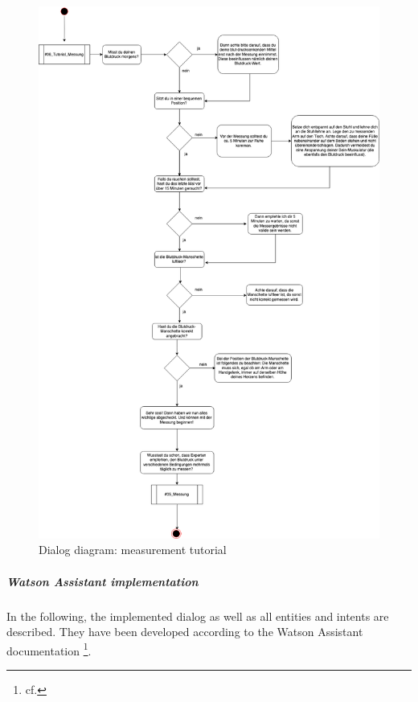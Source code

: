 \begin{figure}[h]
	\centering
	\includegraphics[width=1\textwidth]{images/04_tutorial_messung.png}
	\caption{Dialog diagram: measurement tutorial}
	\label{dialog_diagram_04}
\end{figure}


\subparagraph{Watson Assistant implementation}

In the following, the implemented dialog as well as all entities and intents are described. They have been developed according to the Watson Assistant documentation \footnote{cf.\autocite{wa_docu}}.

